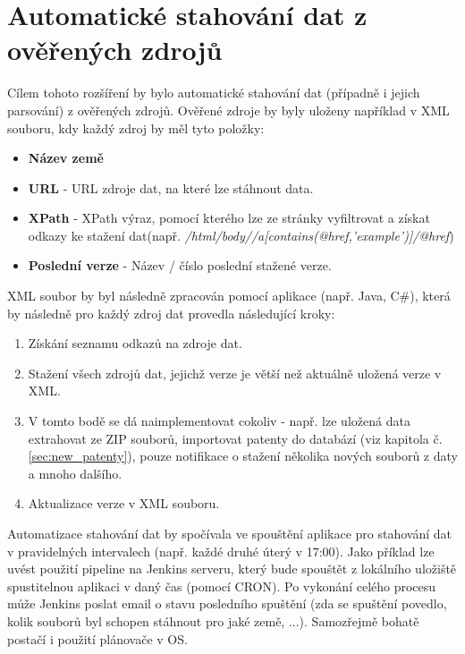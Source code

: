 \section{Automatické stahování dat z ověřených zdrojů}
Cílem tohoto rozšíření by bylo automatické stahování dat (případně i jejich parsování) z ověřených zdrojů. Ověřené zdroje by byly uloženy například v XML souboru, kdy každý zdroj by měl tyto položky:
\begin{itemize}
\item \textbf{Název země}
\item \textbf{URL} - URL zdroje dat, na které lze stáhnout data.
\item \textbf{XPath} -  XPath výraz, pomocí kterého lze ze stránky vyfiltrovat a získat odkazy ke stažení dat\newline (např. \textit{/html/body//a[contains(@href,'example')]/@href})
\item \textbf{Poslední verze} - Název / číslo poslední stažené verze.
\end{itemize}
XML soubor by byl následně zpracován pomocí aplikace (např. Java, C\#), která by následně pro každý zdroj dat provedla následující kroky:
\begin{enumerate}
\item Získání seznamu odkazů na zdroje dat.
\item Stažení všech zdrojů dat, jejichž verze je větší než aktuálně uložená verze v XML.
\item V tomto bodě se dá naimplementovat cokoliv - např. lze uložená data extrahovat ze ZIP souborů, importovat patenty do databází (viz kapitola č. \ref{sec:new_patenty}), pouze notifikace o stažení několika nových souborů z daty a mnoho dalšího.
\item Aktualizace verze v XML souboru.
\end{enumerate}
Automatizace stahování dat by spočívala ve spouštění aplikace pro stahování dat v pravidelných intervalech (např. každé druhé úterý v 17:00). Jako příklad lze uvést použití pipeline na Jenkins serveru, který bude spouštět z lokálního uložiště spustitelnou aplikaci v daný čas (pomocí CRON). Po vykonání celého procesu může Jenkins poslat email o stavu posledního spuštění (zda se spuštění povedlo, kolik souborů byl schopen stáhnout pro jaké země, ...). Samozřejmě bohatě postačí i použití plánovače v OS.
